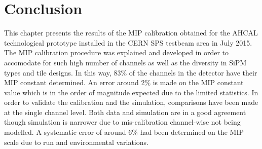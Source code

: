 \section{Conclusion}

This chapter presents the results of the MIP calibration obtained for the AHCAL technological prototype installed in the CERN SPS testbeam area in July 2015. The MIP calibration procedure was explained and developed in order to accomodate for such high number of channels as well as the diversity in SiPM types and tile designs. In this way, 83\% of the channels in the detector have their MIP constant determined. An error around 2\% is made on the MIP constant value which is in the order of magnitude expected due to the limited statistics. In order to validate the calibration and the simulation, comparisons have been made at the single channel level. Both data and simulation are in a good agreement though simulation is narrower due to mis-calibration channel-wise not being modelled. A systematic error of around 6\% had been determined on the MIP scale due to run and environmental variations.
